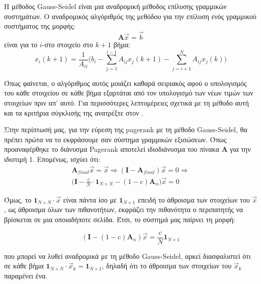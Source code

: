 H μέθοδος Gauss-Seidel είναι μια αναδρομική μέθοδος επίλυσης γραμμικών συστημάτων. Ο αναδρομικός αλγόριθμός της μεθόδου για την επίλυση ενός γραμμικού συστήματος της μορφής:
$$\bm{A}\vec{x}=\vec{b}$$
είναι για το $i$-στο στοιχείο στο $k+1$ βήμα:
$$x_i(k+1) = \frac{1}{A_{ii}}\bigg(b_i-\sum_{j=1}^{i-1}A_{ij}x_j(k+1)-\sum_{j=i+1}^{N}A_{ij}x_j(k)\bigg)$$

Όπως φαίνεται, ο αλγόριθμος αυτός μοιάζει καθαρά σειριακός αφού ο υπολογισμός του κάθε στοιχείου σε κάθε βήμα εξαρτάται από τον υπολογισμό των νέων τιμών των στοιχείων πριν απ' αυτό.
Για περισσότερες λεπτομέρειες σχετικά με τη μέθοδο αυτή και τα κριτήρια σύγκλισής της ανατρέξτε στον \textcite{saad2003iterative}.

Στην περίπτωσή μας, για την εύρεση της pagerank με τη μέθοδο Gauss-Seidel, θα πρέπει πρώτα να το εκφράσουμε σαν σύστημα γραμμικών εξισώσεων. Όπως προαναφέρθηκε το διάνυσμα Pagerank αποτελεί ιδιοδιάνυσμα του πίνακα $\bm{A}$ για την ιδιοτιμή 1. Επομένως, ισχύει ότι:\\
\begin{multline*}
\bm{A}_{final}\vec{x} = \vec{x}\Rightarrow (\bm{I}-\bm{A}_{final})\vec{x} = 0 
\Rightarrow \\
\bigg(\bm{I}-\frac{c}{N}\cdot\bm{1}_{N\times N}-(1-c)\bm{A}_n\bigg)\vec{x} = 0
\end{multline*}

Όμως, το $\bm{1}_{N\times N}\cdot\vec{x}$ είναι πάντα ίσο με $\bm{1}_{N\times1}$ επειδή το άθροισμα των στοιχείων του $\vec{x}$, ως άθροισμα όλων των πιθανοτήτων, εκφράζει την πιθανότητα ο περιπατητής να βρίσκεται σε μια οποιαδήποτε σελίδα.
 Έτσι, το σύστημά μας παίρνει τη μορφή:

\begin{equation} \label{eq:1}
(\bm{I}-(1-c)\bm{A}_n)\vec{x} = \frac{c}{N}\bm{1}_{N\times1}
\end{equation}

που μπορεί να λυθεί αναδρομικά με τη μέθοδο Gauss-Seidel, αρκεί διασφαλιστεί ότι σε κάθε βήμα $\bm{1}_{N\times N}\cdot\vec{x}_k =\bm{1}_{N\times1}$, δηλαδή ότι το άθροισμα των στοιχείων του $\vec{x}_k$ παραμένει ένα.
